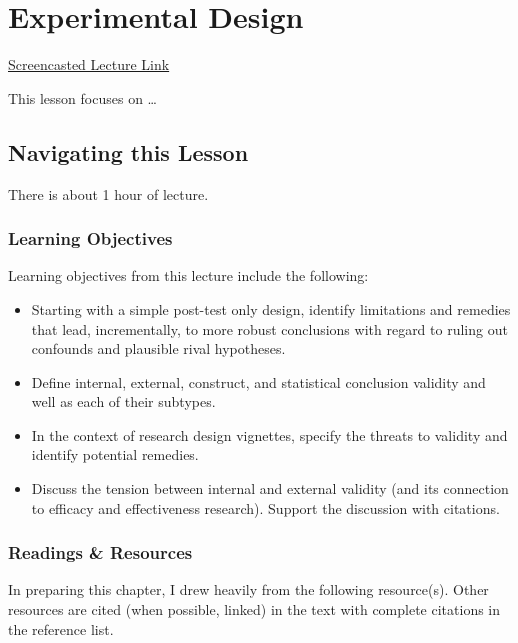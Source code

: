 \documentclass[
  english,
]{book}
\providecommand{\tightlist}{%
  \setlength{\itemsep}{0pt}\setlength{\parskip}{0pt}}
\begin{document}
\hypertarget{Experimental}{%
\chapter{Experimental Design}\label{Experimental}}

\href{https://spu.hosted.panopto.com/Panopto/Pages/Viewer.aspx?pid=8b4b668f-3ec7-4c20-93de-ac4a01874ff4}{Screencasted Lecture Link}

This lesson focuses on \ldots{}

\hypertarget{navigating-this-lesson-2}{%
\section{Navigating this Lesson}\label{navigating-this-lesson-2}}

There is about 1 hour of lecture.

\hypertarget{learning-objectives-2}{%
\subsection{Learning Objectives}\label{learning-objectives-2}}

Learning objectives from this lecture include the following:

\begin{itemize}
\tightlist
\item
  Starting with a simple post-test only design, identify limitations and remedies that lead, incrementally, to more robust conclusions with regard to ruling out confounds and plausible rival hypotheses.
\item
  Define internal, external, construct, and statistical conclusion validity and well as each of their subtypes.
\item
  In the context of research design vignettes, specify the threats to validity and identify potential remedies.\\
\item
  Discuss the tension between internal and external validity (and its connection to efficacy and effectiveness research). Support the discussion with citations.
\end{itemize}

\hypertarget{readings-resources-2}{%
\subsection{Readings \& Resources}\label{readings-resources-2}}

In preparing this chapter, I drew heavily from the following resource(s). Other resources are cited (when possible, linked) in the text with complete citations in the reference list.
\end{document}
